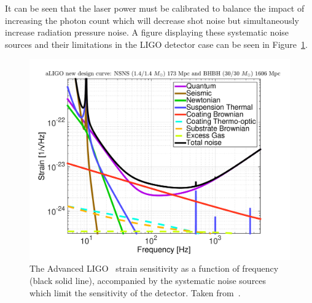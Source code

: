 It can be seen that the laser power must be calibrated to balance the impact of increasing the photon count which will decrease shot noise but simultaneously increase radiation pressure noise. A figure displaying these systematic noise sources and their limitations in the LIGO detector case can be seen in Figure~\ref{3:fig:aLIGO_noise}.
%
\begin{figure}
    \centering
    \includegraphics[width=0.75\linewidth]{images/3_detector_characterisation/aLIGO_newDesign.pdf}
    \caption{The Advanced LIGO~\cite{aLIGO:2015} strain sensitivity as a function of frequency (black solid line), accompanied by the systematic noise sources which limit the sensitivity of the detector. Taken from~\cite{aLIGO_design_curve:2018}.}
    \label{3:fig:aLIGO_noise}
\end{figure}
%

